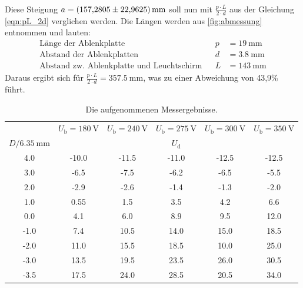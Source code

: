\noindent
Diese Steigung $a = \SI{157.2805 \pm 22.9625}{\milli\metre}$ soll nun mit $\frac{p \cdot L}{2\cdot d}$ aus der Gleichung \eqref{eqn:pL_2d} verglichen werden.
Die Längen werden aus \autoref{fig:abmessung} entnommen und lauten:
\begin{align*}
    \text{Länge der Ablenkplatte}& &p &= \SI{19}{\milli\metre} \\
    \text{Abstand der Ablenkplatten}& &d &= \SI{3.8}{\milli\metre} \\
    \text{Abstand zw. Ablenkplatte und Leuchtschirm}& &L &= \SI{143}{\milli\metre}
\end{align*}
Daraus ergibt sich für $\frac{p \cdot L}{2\cdot d} = \SI{357.5}{\milli\meter}$, was zu einer Abweichung von 43,9\% führt.

\begin{table} 
    \centering
    \caption{Die aufgenommenen Messergebnisse. } 
    \label{tab:eFeldTeil1}
    \begin{tabular}{c c c c c c}%
        \toprule
        & $U_\text{b} = \SI{180}{\volt}$ & $U_\text{b} = \SI{240}{\volt}$&  $U_\text{b} = \SI{275}{\volt} $ & $U_\text{b} = \SI{300}{\volt}$ & $U_\text{b} = \SI{350}{\volt}$\\
      \cmidrule(lr){2-6}
      $ D / \SI{6,35}{\milli\metre}$ & \multicolumn{5}{c}{$U_\text{d}$}\\    %
      \midrule
      4.0 & -10.0 & -11.5 & -11.0 & -12.5 & -12.5 \\
      3.0 & -6.5 & -7.5 & -6.2 & -6.5 & -5.5 \\
      2.0 & -2.9 & -2.6 & -1.4 & -1.3 & -2.0 \\
      1.0 & 0.55 & 1.5 & 3.5 & 4.2 & 6.6 \\
      0.0 & 4.1 & 6.0 & 8.9 & 9.5 & 12.0 \\
      -1.0 & 7.4 & 10.5 & 14.0 & 15.0 & 18.5 \\
      -2.0 & 11.0 & 15.5 & 18.5 & 10.0 & 25.0 \\
      -3.0 & 13.5 & 19.5 & 23.5 & 26.0 & 30.5 \\
      -3.5 & 17.5 & 24.0 & 28.5 & 20.5 & 34.0 \\
      \bottomrule
    \end{tabular}
  \end{table}

